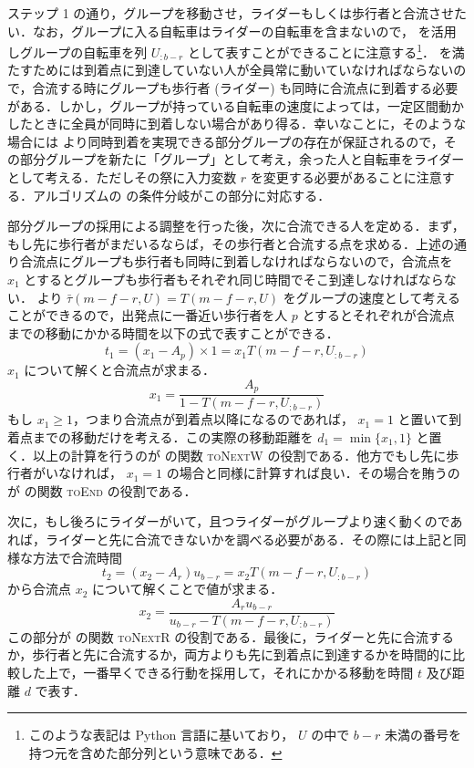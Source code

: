 ステップ 1 の通り，グループを移動させ，ライダーもしくは歩行者と合流させたい．なお，グループに入る自転車はライダーの自転車を含まないので，  を活用しグループの自転車を列 $U_{:b-r}$ として表すことができることに注意する\footnote{このような表記は Python 言語に基いており， $U$ の中で $b-r$ 未満の番号を持つ元を含めた部分列という意味である．}．  を満たすためには到着点に到達していない人が全員常に動いていなければならないので，合流する時にグループも歩行者 (ライダー) も同時に合流点に到着する必要がある．しかし，グループが持っている自転車の速度によっては，一定区間動かしたときに全員が同時に到着しない場合があり得る．幸いなことに，そのような場合には  より同時到着を実現できる部分グループの存在が保証されるので，その部分グループを新たに「グループ」として考え，余った人と自転車をライダーとして考える．ただしその祭に入力変数 $r$ を変更する必要があることに注意する．アルゴリズムの  の条件分岐がこの部分に対応する．

部分グループの採用による調整を行った後，次に合流できる人を定める．まず，もし先に歩行者がまだいるならば，その歩行者と合流する点を求める．上述の通り合流点にグループも歩行者も同時に到着しなければならないので，合流点を $x_1$ とするとグループも歩行者もそれぞれ同じ時間でそこ到達しなければならない．  より $\bar\tau(m - f - r, U) = T(m - f - r, U)$ をグループの速度として考えることができるので，出発点に一番近い歩行者を人 $p$ とするとそれぞれが合流点までの移動にかかる時間を以下の式で表すことができる．
\begin{equation}
  t_1 = (x_1 - A_p) \times 1 = x_1T(m - f - r, U_{:b-r})
\end{equation}
$x_1$ について解くと合流点が求まる．
\begin{equation}
  x_1 = \frac{A_p}{1 - T(m - f - r, U_{:b-r})}
\end{equation}
もし $x_1 \geq 1$，つまり合流点が到着点以降になるのであれば， $x_1 = 1$ と置いて到着点までの移動だけを考える．この実際の移動距離を $d_1 = \min \{x_1, 1\}$ と置く．以上の計算を行うのが  の関数 \textsc{toNextW} の役割である．他方でもし先に歩行者がいなければ， $x_1 = 1$ の場合と同様に計算すれば良い．その場合を賄うのが  の関数 \textsc{toEnd} の役割である．

次に，もし後ろにライダーがいて，且つライダーがグループより速く動くのであれば，ライダーと先に合流できないかを調べる必要がある．その際には上記と同様な方法で合流時間
\begin{equation}
  t_2 = (x_2 - A_r)u_{b - r} = x_2T(m - f - r, U_{:b-r})
\end{equation}
から合流点 $x_2$ について解くことで値が求まる．
\begin{equation}
  x_2 = \frac{A_ru_{b - r}}{u_{b-r} - T(m - f - r, U_{:b-r})}
\end{equation}
この部分が  の関数 \textsc{toNextR} の役割である．最後に，ライダーと先に合流するか，歩行者と先に合流するか，両方よりも先に到着点に到達するかを時間的に比較した上で，一番早くできる行動を採用して，それにかかる移動を時間 $t$ 及び距離 $d$ で表す．

